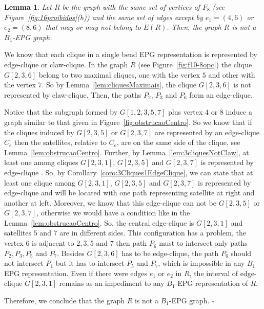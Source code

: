 \documentclass[9pt]{entcs}
\newtheorem{lema}[thm]{Lemma}%
\begin{document}
% 

\begin{lema}\label{lem:F10-8opcIsNotB1EPG}
Let $R$ be the graph with the same set of vertices of $F_{8}$ (see Figure~\ref{fig:16proibidos}(h)) and the same set of edges except by $e_1=(4,6)$ or   $e_2=(8,6)$  that may or may not belong to $E(R)$. Then, the graph $R$  is not a $B_1$-EPG graph. 
\end{lema}

\begin{pf}
We know that each clique in a single bend EPG representation is represented by edge-clique or claw-clique. In the graph $R$ %
(see Figure~\ref{fig:f10-8opc}) the clique $G[2,3,6]$ belong to two maximal cliques, one with the vertex $5$ and other with the vertex $7$. So by Lemma~\ref{lem:cliquesMaximais}, the clique $G[2,3,6]$ is not represented by claw-clique. Then, the paths $P_{2}$, $P_{3}$ and $P_{6}$ form  an edge-clique.

Notice that the subgraph formed by $G[1,2,3,5,7]$ plus vertex $4$ or $8$ induce a graph similar to that given in Figure~\ref{fig:obstrucaoCentro}. So we know that if the cliques induced by $G[2,3,5]$ or $G[2,3,7]$ are represented by an edge-clique $C_e$ then the satellites, relative to $C_e$, are on the same side of the clique, see Lemma~\ref{lem:obstrucaoCentro}. Further, by Lemma~\ref{lem:3cliquesNotClaw}, at least one among cliques $G[2,3,1]$, $G[2,3,5]$ and $G[2,3,7]$  is represented by edge-clique .
So, by Corollary~\ref{coro:3Cliques1EdgeClique}, we can state that at least one clique among $G[2,3,1]$, $G[2,3,5]$ and $G[2,3,7]$ is represented by edge-clique and will be located with one path representing satellite at right and another at left. Moreover, we know that this edge-clique can not be $G[2,3,5]$ or $G[2,3,7]$, otherwise we would have a condition like in the Lemma~\ref{lem:obstrucaoCentro}. So, the central edge-clique is $G[2,3,1]$ and satellites $5$ and $7$ are in different sides. This configuration has a problem, the vertex $6$ is adjacent to $2, 3, 5$ and $7$ then path $P_6$ must to intersect only paths $P_2, P_3, P_5$ and $P_7$. Besides $G[2,3,6]$ has to be edge-clique, the path $P_6$  should not intersect $P_1$ but it has to intersect $P_5$ and $P_7$, which is impossible in any $B_1$-EPG representation.  Even if there were edges $e_1$ or $e_2$ in $R$, the interval of edge-clique $G[2,3,1]$ remains as an impediment to any $B_1$-EPG representation of $R$.

Therefore, we conclude that the graph $R$ is not a $B_1$-EPG graph.
 $\square$\end{pf} 
\end{document}
